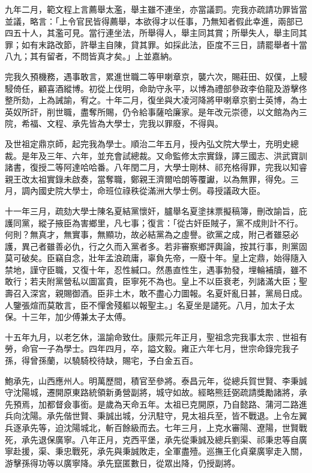 \begin{pinyinscope}
九年二月，範文程上言薦舉太濫，舉主雖不連坐，亦當議罰。完我亦疏請功罪皆當並議，略言：「上令官民皆得薦舉，本欲得才以任事，乃無知者假此幸進，兩部已四五十人，其濫可見。當行連坐法，所舉得人，舉主同其賞；所舉失人，舉主同其罪；如有末路改節，許舉主自陳，貸其罪。如採此法，臣度不三日，請罷舉者十當八九；其有留者，不問皆真才矣。」上並嘉納。

完我久預機務，遇事敢言，累進世職二等甲喇章京，襲六次，賜莊田、奴僕，上駸駸倚任，顧喜酒縱博。初從上伐明，命助守永平，以博為禮部參政李伯龍及游擊佟整所劾，上為誡諭，宥之。十年二月，復坐與大凌河降將甲喇章京劉士英博，為士英奴所訐，削世職，盡奪所賜，仍令給事薩哈廉家。是年改元崇德，以文館為內三院，希福、文程、承先皆為大學士，完我以罪廢，不得與。

及世祖定鼎京師，起完我為學士。順治二年五月，授內弘文院大學士，充明史總裁。是年及三年、六年，並充會試總裁。又命監修太宗實錄，譯三國志、洪武寶訓諸書，復授二等阿達哈哈番。八年閏二月，大學士剛林、祁充格得罪，完我以知睿親王改太祖實錄未啟奏，當奪職，鄭親王濟爾哈朗等覆讞，以為無罪，得免。三月，調內國史院大學士，命班位祿秩從滿洲大學士例。尋授議政大臣。

十一年三月，疏劾大學士陳名夏結黨懷奸，臚舉名夏塗抹票擬稿簿，刪改諭旨，庇護同黨，縱子掖臣為害鄉里，凡七事；復言：「從古奸臣賊子，黨不成則計不行。何則？無真才，無實事，無顯功，故必結黨為之虛譽。欲黨之成，附己者雖惡必護，異己者雖善必仇，行之久而入黨者多。若非審察鄉評輿論，按其行事，則黨固莫可破矣。臣竊自念，壯年孟浪疏庸，辜負先帝，一廢十年。皇上定鼎，始得隨入禁地，謹守臣職，又復十年，忍性緘口。然愚直性生，遇事勃發，埋輪補牘，雖不敢行；若夫附黨營私以圖富貴，臣寧死不為也。皇上不以臣衰老，列諸滿大臣；聖壽召入深宮，親賜御酒。臣非土木，敢不盡心力圖報。名夏奸亂日甚，黨局日成。人鑒張煊而莫敢言，臣不憚舍殘軀以報聖主。」名夏坐是譴死。八月，加太子太保。十三年，加少傅兼太子太傅。

十五年九月，以老乞休，溫諭命致仕。康熙元年正月，聖祖念完我事太宗﹑世祖有勞，命官一子為學士。四年四月，卒，謚文毅。雍正六年七月，世宗命錄完我子孫，得曾孫蘭，以驍騎校待缺，賜宅，予白金五百。

鮑承先，山西應州人。明萬歷間，積官至參將。泰昌元年，從總兵賀世賢、李秉誠守沈陽城，遷開原東路統領新勇營副將，城守如故。經略熊廷弼疏請獎勵諸將，承先預焉，加都督僉事銜。是歲為天命五年。太祖已克開原，乃自懿路、蒲河二路進兵向沈陽。承先偕世賢、秉誠出城，分汛駐守，見太祖兵至，皆不戰退。上令左翼兵逐承先等，迫沈陽城北，斬百餘級而去。七年三月，上克水審陽、遼陽，世賢戰死，承先退保廣寧。八年正月，克西平堡，承先從秉誠及總兵劉渠、祁秉忠等自廣寧赴援，渠、秉忠戰死，承先與秉誠敗走，全軍盡殪。巡撫王化貞棄廣寧走入關，游擊孫得功等以廣寧降。承先竄匿數日，從眾出降，仍授副將。


\end{pinyinscope}

